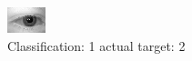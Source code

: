 \begin{figure}[h!]
\begin{center}
\includegraphics[width=0.60\columnwidth]{figures/ID398_class_1_target_2.png}
\end{center}
\caption{ Classification: 1 actual target: 2}
\label{fig:ID398_class_1_target_2}
\end{figure}
